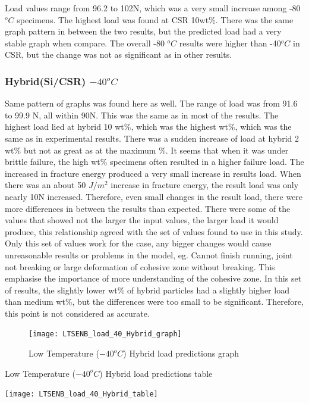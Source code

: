 \documentclass[numbers=noendperiod,chapterprefix=on]{icldt} %
\begin{document}
Load values range from 96.2 to 102N, which was a very small increase among -80 $ ^{o}C $ specimens. The highest load was found at CSR 10wt\%. There was the same graph pattern in between the two results, but the predicted load had a very stable graph when compare. The overall -80 $ ^{o}C $ results were higher than -40$ ^{o}C $ in CSR, but the change was not as significant as in other results.

\subsubsection{Hybrid(Si/CSR) $ -40 ^{o}C$}

Same pattern of graphs was found here as well. The range of load was from 91.6 to 99.9 N, all within 90N. This was the same as in most of the results. The highest load lied at hybrid 10 wt\%, which was the highest wt\%, which was the same as in experimental results. There was a sudden increase of load at hybrid 2 wt\% but not as great as at the maximum \%.  It seems that when it was under brittle failure, the high wt\% specimens often resulted in a higher failure load.
The increased in fracture energy produced a very small increase in results load. When there was an about 50 $ J/m^{2} $ increase in fracture energy, the result load was only nearly 10N increased. Therefore, even small changes in the result load, there were more differences in between the results than expected. 
There were some of the values that showed not the larger the input values, the larger load it would produce, this relationship agreed with the set of values found to use in this study. Only this set of values work for the case, any bigger changes would cause unreasonable results or problems in the model, eg. Cannot finish running, joint not breaking or large deformation of cohesive zone without breaking. This emphasise the importance of more understanding of the cohesive zone.
In this set of results, the slightly lower wt\% of hybrid particles had a slightly higher load than medium wt\%, but the differences were too small to be significant. Therefore, this point is not considered as accurate.

\begin{figure}[!hp]
  \centering
  \texttt{[image: LTSENB\_load\_40\_Hybrid\_graph]}\label{LTSENB_load_40_Hybrid_graph}
  \caption{Low Temperature ($ -40 ^{o}C$) Hybrid load predictions graph}
  \end{figure}
 \FloatBarrier
 
 \begin{table}
    \centering
    \caption{Low Temperature ($ -40 ^{o}C$) Hybrid load predictions table}\label{LTSENB_load_40_Hybrid_table}
    \texttt{[image: LTSENB\_load\_40\_Hybrid\_table]}
    \end{table}
    \FloatBarrier
\end{document}
